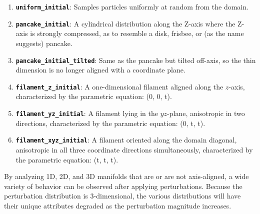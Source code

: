 \begin{enumerate}
    \item \textbf{\texttt{uniform\_initial}}: Samples particles uniformly at random from the domain.
    \item \textbf{\texttt{pancake\_initial}}: A cylindrical distribution along the Z-axis where the Z-axis is strongly compressed, as to resemble a disk, frisbee, or (as the name suggests) pancake.
    \item \textbf{\texttt{pancake\_initial\_tilted}}: Same as the pancake but tilted off-axis, so the thin dimension is no longer aligned with a coordinate plane.
    \item \textbf{\texttt{filament\_z\_initial}}: A one-dimensional filament aligned along the $z$-axis, characterized by the parametric equation: (0, 0, t).
    \item \textbf{\texttt{filament\_yz\_initial}}: A filament lying in the $yz$-plane, anisotropic in two directions, characterized by the parametric equation: (0, t, t).
    \item \textbf{\texttt{filament\_xyz\_initial}}: A filament oriented along the domain diagonal, anisotropic in all three coordinate directions simultaneously, characterized by the parametric equation: (t, t, t).
\end{enumerate}

By analyzing 1D, 2D, and 3D manifolds that are or are not axis-aligned, a wide variety of behavior can be observed after applying perturbations. Because the perturbation distribution is 3-dimensional, the various distributions will have their unique attributes degraded as the perturbation magnitude increases.  



